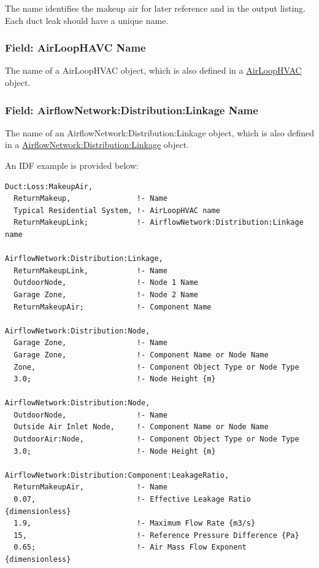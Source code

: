 The name identifies the makeup air for later reference and in the output listing. Each duct leak should have a unique name.

\subsubsection{Field: AirLoopHAVC Name}\label{duct-leakage-airloophavcname}

The name of a AirLoopHVAC object, which is also defined in a \hyperref[airloophvac]{AirLoopHVAC} object.

\subsubsection{Field: AirflowNetwork:Distribution:Linkage Name}\label{airflownetworkdistributionlinkagename}

The name of an AirflowNetwork:Distribution:Linkage object, which is also defined in a \hyperref[airflownetworkdistributionlinkage]{AirflowNetwork:Distribution:Linkage} object.

An IDF example is provided below:

\begin{lstlisting}
Duct:Loss:MakeupAir,
  ReturnMakeup,               !- Name
  Typical Residential System, !- AirLoopHVAC name
  ReturnMakeupLink;           !- AirflowNetwork:Distribution:Linkage name

AirflowNetwork:Distribution:Linkage,
  ReturnMakeupLink,           !- Name
  OutdoorNode,                !- Node 1 Name
  Garage Zone,                !- Node 2 Name
  ReturnMakeupAir;            !- Component Name

AirflowNetwork:Distribution:Node,
  Garage Zone,                !- Name
  Garage Zone,                !- Component Name or Node Name
  Zone,                       !- Component Object Type or Node Type
  3.0;                        !- Node Height {m}

AirflowNetwork:Distribution:Node,
  OutdoorNode,                !- Name
  Outside Air Inlet Node,     !- Component Name or Node Name
  OutdoorAir:Node,            !- Component Object Type or Node Type
  3.0;                        !- Node Height {m}

AirflowNetwork:Distribution:Component:LeakageRatio,
  ReturnMakeupAir,            !- Name
  0.07,                       !- Effective Leakage Ratio {dimensionless}
  1.9,                        !- Maximum Flow Rate {m3/s}
  15,                         !- Reference Pressure Difference {Pa}
  0.65;                       !- Air Mass Flow Exponent {dimensionless}
\end{lstlisting}

